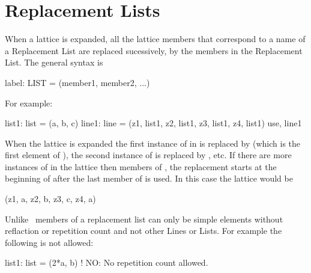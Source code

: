 \section{Replacement Lists}

When a lattice is expanded, all the lattice members that correspond to a name of a Replacement List 
are replaced sucessively, by the members
in the Replacement List. The general syntax is
\begin{example}
  label: LIST = (member1, member2, ...)
\end{example}
For example:
\begin{example}
  list1: list = (a, b, c)
  line1: line = (z1, list1, z2, list1, z3, list1, z4, list1)
  use, line1
\end{example}
When the lattice is expanded the first instance of  in  is replaced by  
(which is the first element of ), the second instance of  is replaced by ,
etc. If there are more instances of  in the lattice then members of ,
the replacement starts at the beginning of  after the last member of  is used.
In this case the lattice would be
\begin{example}
  (z1, a, z2, b, z3, c, z4, a)
\end{example}
Unlike \mad\, members of a replacement list can only be simple elements without reflaction or repetition count and not other Lines or Lists. For example the following is not allowed:
\begin{example}
  list1: list = (2*a, b)  ! NO: No repetition count allowed.
\end{example}